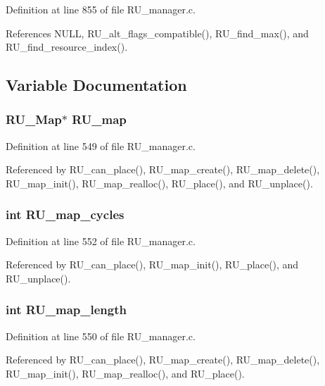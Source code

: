 Definition at line 855 of file RU\_\-manager.c.

References NULL, RU\_\-alt\_\-flags\_\-compatible(), RU\_\-find\_\-max(), and RU\_\-find\_\-resource\_\-index().

\subsection{Variable Documentation}
\subsubsection{\setlength{\rightskip}{0pt plus 5cm}\bf{RU\_\-Map}$\ast$ \bf{RU\_\-map}}\label{RU__manager_8h_1ec86ac6a189f5faa72bf350572c35e1}




Definition at line 549 of file RU\_\-manager.c.

Referenced by RU\_\-can\_\-place(), RU\_\-map\_\-create(), RU\_\-map\_\-delete(), RU\_\-map\_\-init(), RU\_\-map\_\-realloc(), RU\_\-place(), and RU\_\-unplace().
\subsubsection{\setlength{\rightskip}{0pt plus 5cm}int \bf{RU\_\-map\_\-cycles}}\label{RU__manager_8h_5b28f480dd80edd9d86edc9bfd31ce2b}




Definition at line 552 of file RU\_\-manager.c.

Referenced by RU\_\-can\_\-place(), RU\_\-map\_\-init(), RU\_\-place(), and RU\_\-unplace().
\subsubsection{\setlength{\rightskip}{0pt plus 5cm}int \bf{RU\_\-map\_\-length}}\label{RU__manager_8h_f866276404030638648a12e4eb39e048}




Definition at line 550 of file RU\_\-manager.c.

Referenced by RU\_\-can\_\-place(), RU\_\-map\_\-create(), RU\_\-map\_\-delete(), RU\_\-map\_\-init(), RU\_\-map\_\-realloc(), and RU\_\-place().
